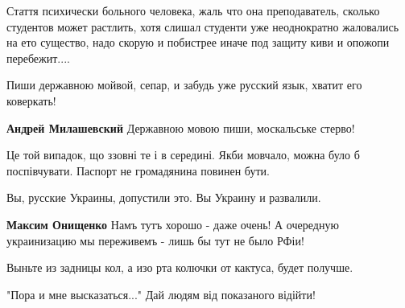 \begin{itemize}
Стаття психически больного человека, жаль что она преподаватель, сколько
студентов может растлить, хотя слишал студенти уже неоднократно жаловались на
ето существо, надо скорую и побистрее иначе под защиту киви и опожопи
перебежит....

\begin{itemize}

Пиши державною мойвой, сепар, и забудь уже русский язык, хватит его коверкать!


\textbf{Андрей Милашевский} Державною мовою пиши, москальське стерво!
\end{itemize}


Це той випадок, що ззовні те і в середині. Якби мовчало, можна було б
поспівчувати. Паспорт не громадянина повинен бути.



Вы, русские Украины, допустили это. Вы Украину и развалили.

\begin{itemize}

\textbf{Максим Онищенко} Намъ тутъ хорошо - даже очень! А очередную украинизацию мы переживемъ - лишь бы тут не было РФіи!


Выньте из задницы кол, а изо рта колючки от кактуса, будет получше.
\end{itemize}


"Пора и мне высказаться..." Дай людям від показаного відійти!



\end{itemize}
